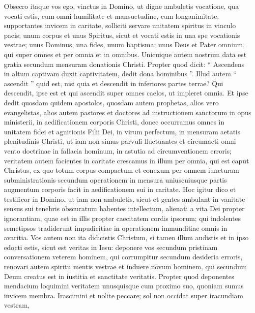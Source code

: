 \begin{biblechapter}
\begin{biblechapter}
\begin{biblechapter}
\begin{biblechapter}
\verse Obsecro itaque vos ego, vinctus in Domino, ut digne ambuletis vocatione, qua vocati estis, 
\verse cum omni humilitate et mansuetudine, cum longanimitate, supportantes invicem in caritate, 
\verse solliciti servare unitatem spiritus in vinculo pacis; 
\verse unum corpus et unus Spiritus, sicut et vocati estis in una spe vocationis vestrae; 
\verse unus Dominus, una fides, unum baptisma; 
\verse unus Deus et Pater omnium, qui super omnes et per omnia et in omnibus.
 \verse Unicuique autem nostrum data est gratia secundum mensuram donationis Christi. \verse Propter quod dicit:
 “ Ascendens in altum captivam duxit captivitatem,
 dedit dona hominibus ”.
 \verse Illud autem “ ascendit ” quid est, nisi quia et descendit in inferiores partes terrae? 
\verse Qui descendit, ipse est et qui ascendit super omnes caelos, ut impleret omnia. 
\verse Et ipse dedit quosdam quidem apostolos, quosdam autem prophetas, alios vero evangelistas, alios autem pastores et doctores 
\verse ad instructionem sanctorum in opus ministerii, in aedificationem corporis Christi, 
\verse donec occurramus omnes in unitatem fidei et agnitionis Filii Dei, in virum perfectum, in mensuram aetatis plenitudinis Christi, 
\verse ut iam non simus parvuli fluctuantes et circumacti omni vento doctrinae in fallacia hominum, in astutia ad circumventionem erroris; 
\verse veritatem autem facientes in caritate crescamus in illum per omnia, qui est caput Christus, 
\verse ex quo totum corpus compactum et conexum per omnem iuncturam subministrationis secundum operationem in mensura uniuscuiusque partis augmentum corporis facit in aedificationem sui in caritate.
 \verse Hoc igitur dico et testificor in Domino, ut iam non ambuletis, sicut et gentes ambulant in vanitate sensus sui 
\verse tenebris obscuratum habentes intellectum, alienati a vita Dei propter ignorantiam, quae est in illis propter caecitatem cordis ipsorum; 
\verse qui indolentes semetipsos tradiderunt impudicitiae in operationem immunditiae omnis in avaritia.
 \verse Vos autem non ita didicistis Christum, 
\verse si tamen illum audistis et in ipso edocti estis, sicut est veritas in Iesu: 
\verse deponere vos secundum pristinam conversationem veterem hominem, qui corrumpitur secundum desideria erroris, 
\verse renovari autem spiritu mentis vestrae 
\verse et induere novum hominem, qui secundum Deum creatus est in iustitia et sanctitate veritatis. 
 \verse Propter quod deponentes mendacium loquimini veritatem unusquisque cum proximo suo, quoniam sumus invicem membra. 
\verse Irascimini et nolite peccare; sol non occidat super iracundiam vestram, 

\end{biblechapter}
\end{biblechapter}
\end{biblechapter}
\end{biblechapter}
